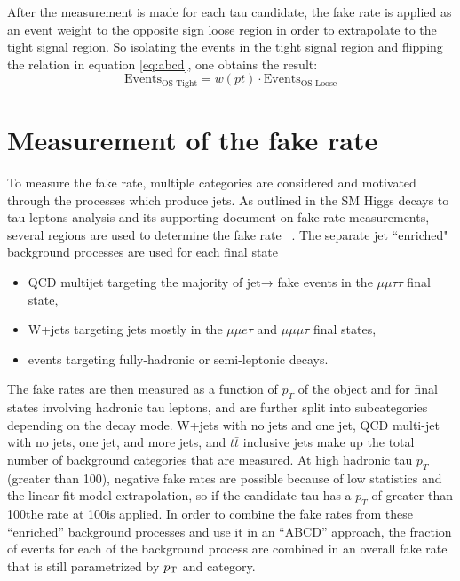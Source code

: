 After the measurement is made for each tau candidate, the fake rate is applied as an event weight to the opposite sign loose region in order to extrapolate to the tight signal region. So isolating the events in the tight signal region and flipping the relation in equation \ref{eq:abcd}, one obtains the result: 
\begin{equation}
\text{Events}_\text{OS Tight} = w(pt)\cdot \text{Events}_\text{OS Loose}  
\end{equation}

\section{Measurement of the fake rate}
To measure the fake rate, multiple categories are considered and motivated through the processes which produce jets. As outlined in the SM Higgs decays to tau leptons analysis and its supporting document on fake rate measurements, several regions are used to determine the fake rate ~\cite{SMHTTarXiv}. The separate jet ``enriched" background processes are used for each final state
\begin{itemize}
	\item QCD multijet targeting the majority of jet→ \tauh fake events in the $\mu\mu\tau\tau$ final state,
	\item W+jets targeting jets mostly in the $\mu\mu e\tau$ and $\mu\mu\mu\tau$ final states,
	\item \ttbar events targeting fully-hadronic or semi-leptonic decays.
\end{itemize} 



The fake rates are then measured as a function of $p_T$ of the object and for final states involving hadronic tau leptons, and are further split into subcategories depending on the decay mode.  
W+jets with no jets and one jet, QCD multi-jet with no jets, one jet, and more jets, and $t\bar{t}$ inclusive jets make up the total number of background categories that are measured. 
At high hadronic tau $p_T$ (greater than 100\GeV), negative fake rates are possible because of low statistics and the linear fit model extrapolation, so if the candidate tau has a $p_T$ of greater than 100\GeV the rate at 100\GeV is applied. 
In order to combine the fake rates from these ``enriched'' background processes and use it in an ``ABCD'' approach, the fraction of events for each of the background process are combined in an overall fake rate that is still parametrized by $p_{\mathrm{T}}$ and category.  

